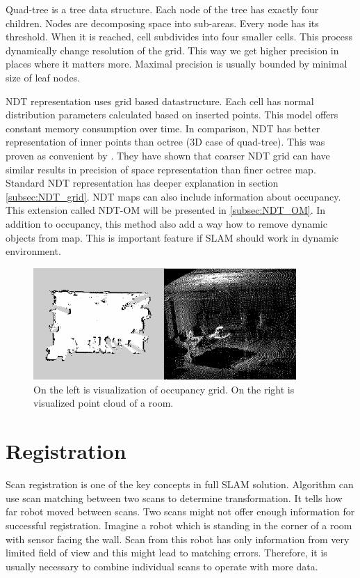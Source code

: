 Quad-tree is a tree data structure. Each node of the tree has exactly four children. Nodes are decomposing space into sub-areas. Every node has its threshold. When it is reached, cell subdivides into four smaller cells. This process dynamically change resolution of the grid. This way we get higher precision in places where it matters more. Maximal precision is usually bounded by minimal size of leaf nodes.

\gls{NDT} representation uses grid based datastructure. Each cell has normal distribution parameters calculated based on inserted points. This model offers constant memory consumption over time. In comparison, \gls{NDT} has better representation of inner points than octree (3D case of quad-tree). This was proven as convenient by \cite{Saarinen13}. They have shown that coarser \gls{NDT} grid can have similar results in precision of space representation than finer octree map. Standard \gls{NDT} representation has deeper explanation in section \ref{subsec:NDT_grid}. \gls{NDT} maps can also include information about occupancy. This extension called \gls{NDT-OM} will be presented in \ref{subsec:NDT_OM}. In addition to occupancy, this method also add a way how to remove dynamic objects from map. This is important feature if \gls{SLAM} should work in dynamic environment.      
\begin{figure}
	\centering
	\includegraphics[width=100mm]{../img/maps.png}
	\caption{On the left is visualization of occupancy grid. On the right is visualized point cloud of a room.}
	\label{fig:maps}
\end{figure}
\newpage

\section{Registration}
\label{sec:Scan_reg}
Scan registration is one of the key concepts in full SLAM solution. Algorithm can use scan matching between two scans to determine transformation. It tells how far robot moved between scans. Two scans might not offer enough information for successful registration. Imagine a robot which is standing in the corner of a room with sensor facing the wall. Scan from this robot has only information from very limited field of view and this might lead to matching errors. Therefore, it is usually necessary to combine individual scans to operate with more data.  

